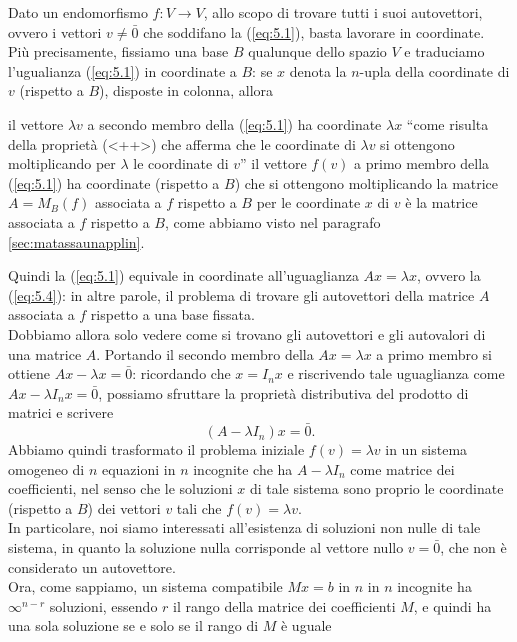 \documentclass{book}
\begin{document}
Dato un endomorfismo $f:V\to V$, allo scopo di trovare tutti i suoi autovettori, ovvero i vettori $v\neq \bar{0}$
che soddifano la (\ref{eq:5.1}), basta lavorare in coordinate.\\
Più precisamente, fissiamo una base $B$ qualunque dello spazio $V$ e traduciamo l'ugualianza (\ref{eq:5.1}) in
coordinate a $B$: se $x$ denota la $n$-upla della coordinate di $v$ (rispetto a $B$), disposte in colonna, allora
\begin{tasks}
  \task il vettore $\lambda v$ a secondo membro della (\ref{eq:5.1}) ha coordinate $\lambda x$ ``come
    risulta della proprietà (<++>) che afferma che le coordinate di $\lambda v$ si ottengono moltiplicando per
  $\lambda$ le coordinate di $v$''
  \task il vettore $f(v)$ a primo membro della (\ref{eq:5.1}) ha coordinate (rispetto a $B$) che si ottengono
  moltiplicando la matrice $A=M_B(f)$ associata a $f$ rispetto a $B$ per le coordinate $x$ di $v$ è la matrice
  associata a $f$ rispetto a $B$, come abbiamo visto nel paragrafo \ref{sec:matassaunapplin}.
\end{tasks}
Quindi la (\ref{eq:5.1}) equivale in coordinate all'uguaglianza $Ax=\lambda x$, ovvero la (\ref{eq:5.4}): in altre
parole, il problema di trovare gli autovettori della matrice $A$ associata a $f$ rispetto a una base fissata.\\
Dobbiamo allora solo vedere come si trovano gli autovettori e gli autovalori di una matrice $A$. Portando il
secondo membro della $Ax=\lambda x$ a primo membro si ottiene $Ax-\lambda x=\bar{0}$: ricordando che $x=I_nx$ e
riscrivendo tale uguaglianza come $Ax-\lambda I_n x=\bar{0}$, possiamo sfruttare la proprietà distributiva del
prodotto di matrici e scrivere
\begin{equation*}
  (A-\lambda I_n)x=\bar{0}.
\end{equation*}
Abbiamo quindi trasformato il problema iniziale $f(v)=\lambda v$ in un sistema omogeneo di $n$ equazioni in $n$
incognite che ha $A-\lambda I_n$ come matrice dei coefficienti, nel senso che le soluzioni $x$ di tale sistema
sono proprio le coordinate (rispetto a $B$) dei vettori $v$ tali che $f(v)=\lambda v$.\\
In particolare, noi siamo interessati all'esistenza di soluzioni non nulle di tale sistema, in quanto la soluzione
nulla corrisponde al vettore nullo $v=\bar{0}$, che non è considerato un autovettore.\\
Ora, come sappiamo, un sistema compatibile $Mx=b$ in $n$ in $n$ incognite ha $\infty^{n-r}$ soluzioni, essendo $r$
il rango della matrice dei coefficienti $M$, e quindi ha una sola soluzione se e solo se il rango di $M$ è uguale
\end{document}
